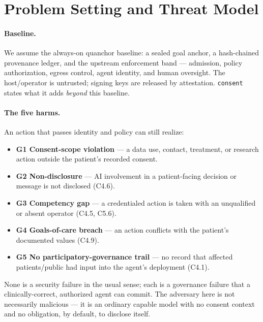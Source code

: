 \documentclass[11pt]{article}
\begin{document}
\section{Problem Setting and Threat Model}
\paragraph{Baseline.} We assume the always-on quanchor baseline: a sealed goal
anchor, a hash-chained provenance ledger, and the upstream enforcement band ---
admission, policy authorization, egress control, agent identity, and human
oversight. The host/operator is untrusted; signing keys are released by
attestation. \texttt{consent} states what it adds \emph{beyond} this baseline.

\paragraph{The five harms.} An action that passes identity and policy can still
realize:
\begin{itemize}
  \item \textbf{G1 Consent-scope violation} --- a data use, contact, treatment, or
  research action outside the patient's recorded consent.
  \item \textbf{G2 Non-disclosure} --- AI involvement in a patient-facing decision
  or message is not disclosed (C4.6).
  \item \textbf{G3 Competency gap} --- a credentialed action is taken with an
  unqualified or absent operator (C4.5, C5.6).
  \item \textbf{G4 Goals-of-care breach} --- an action conflicts with the patient's
  documented values (C4.9).
  \item \textbf{G5 No participatory-governance trail} --- no record that affected
  patients/public had input into the agent's deployment (C4.1).
\end{itemize}
None is a security failure in the usual sense; each is a governance failure that a
clinically-correct, authorized agent can commit. The adversary here is not
necessarily malicious --- it is an ordinary capable model with no consent context
and no obligation, by default, to disclose itself.
\end{document}
